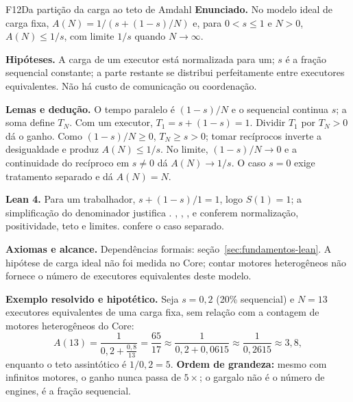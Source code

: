 \begin{formalizacao}{F12}{Da partição da carga ao teto de Amdahl}
\textbf{Enunciado.} No modelo ideal de carga fixa, $A(N)=1/(s+(1-s)/N)$ e, para $0<s\leq1$ e $N>0$, $A(N)\leq1/s$, com limite $1/s$ quando $N\to\infty$.

\textbf{Hipóteses.} A carga de um executor está normalizada para um; $s$ é a fração sequencial constante; a parte restante se distribui perfeitamente entre executores equivalentes. Não há custo de comunicação ou coordenação.

\textbf{Lemas e dedução.} O tempo paralelo é $(1-s)/N$ e o sequencial continua $s$; a soma define $T_N$. Com um executor, $T_1=s+(1-s)=1$. Dividir $T_1$ por $T_N>0$ dá o ganho. Como $(1-s)/N\geq0$, $T_N\geq s>0$; tomar recíprocos inverte a desigualdade e produz $A(N)\leq1/s$. No limite, $(1-s)/N\to0$ e a continuidade do recíproco em $s\ne0$ dá $A(N)\to1/s$. O caso $s=0$ exige tratamento separado e dá $A(N)=N$.

\textbf{Lean 4.} Para um trabalhador, $s+(1-s)/1=1$, logo $S(1)=1$; a simplificação do denominador justifica .  , , ,  e  conferem normalização, positividade, teto e limites.  confere o caso separado.

\textbf{Axiomas e alcance.} Dependências formais: seção~\ref{sec:fundamentos-lean}. A hipótese de carga ideal não foi medida no Core; contar motores heterogêneos não fornece o número de executores equivalentes deste modelo.
\end{formalizacao}

\begin{resultado}
\textbf{Exemplo resolvido e hipotético.} Seja $s = 0{,}2$ (20\% sequencial)
e $N = 13$ executores equivalentes de uma carga fixa, sem relação com a
contagem de motores heterogêneos do Core:
\[ A(13) = \frac{1}{0{,}2 + \frac{0{,}8}{13}} = \frac{65}{17} \approx \frac{1}{0{,}2 + 0{,}0615}
        \approx \frac{1}{0{,}2615} \approx 3{,}8, \]
enquanto o teto assintótico é $1/0{,}2 = 5$. \textbf{Ordem de grandeza:} mesmo com
infinitos motores, o ganho nunca passa de $5\times$; o gargalo não é o número de
engines, é a fração sequencial.
\end{resultado}

